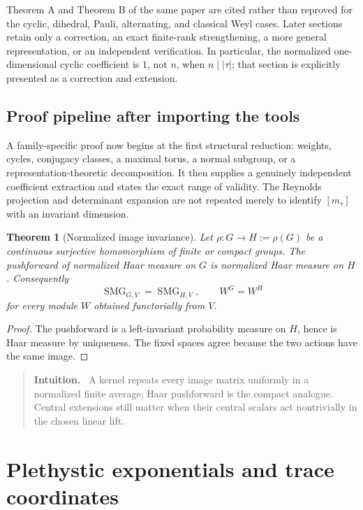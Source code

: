 \documentclass[10pt]{article}
\newcommand{\SMG}{\operatorname{SMG}}
\newcommand{\MGF}{\SMG}
\newenvironment{intuition}{\begin{quote}\small\textbf{Intuition.}\ }{\end{quote}}
\newtheorem{theorem}{Theorem}
\begin{document}
Theorem A and Theorem B of the same paper are cited rather than reproved for
the cyclic, dihedral, Pauli, alternating, and classical Weyl cases. Later
sections retain only a correction, an exact finite-rank strengthening, a more
general representation, or an independent verification. In particular, the
normalized one-dimensional cyclic coefficient is $1$, not $n$, when
$n\mid|\tau|$; that section is explicitly presented as a correction and
extension.

\subsection{Proof pipeline after importing the tools}
A family-specific proof now begins at the first structural reduction:
weights, cycles, conjugacy classes, a maximal torus, a normal subgroup, or a
representation-theoretic decomposition. It then supplies a genuinely
independent coefficient extraction and states the exact range of validity.
The Reynolds projection and determinant expansion are not repeated merely to
identify $[m_\tau]$ with an invariant dimension.

\begin{theorem}[Normalized image invariance]\label{thm:image-invariance}\label{thm:normalized-image-invariance}
Let $\rho:G\to H:=\rho(G)$ be a continuous surjective homomorphism of finite
or compact groups. The pushforward of normalized Haar measure on $G$ is
normalized Haar measure on $H$. Consequently
\[
\MGF_{G,V}=\MGF_{H,V},\qquad W^G=W^H
\]
for every module $W$ obtained functorially from $V$.
\end{theorem}
\begin{proof}
The pushforward is a left-invariant probability measure on $H$, hence is Haar
measure by uniqueness. The fixed spaces agree because the two actions have
the same image.
\end{proof}

\begin{intuition}
A kernel repeats every image matrix uniformly in a normalized finite average;
Haar pushforward is the compact analogue. Central extensions still matter
when their central scalars act nontrivially in the chosen linear lift.
\end{intuition}

\section{Plethystic exponentials and trace coordinates}
\end{document}
